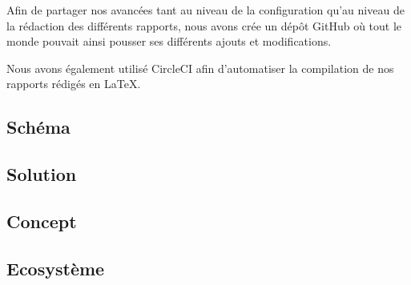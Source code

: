Afin de partager nos avancées tant au niveau de la configuration qu'au niveau de la rédaction des différents rapports, nous avons crée un dépôt GitHub où tout le monde pouvait ainsi pousser ses différents ajouts et modifications. 

Nous avons également utilisé CircleCI afin d'automatiser la compilation de nos rapports rédigés en \LaTeX .

\subsection{Schéma}


\subsection{Solution}


\subsection{Concept}


\subsection{Ecosystème}


